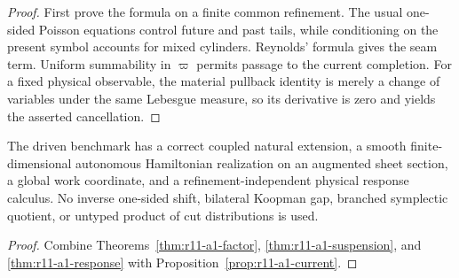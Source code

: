 \begin{proof}
First prove the formula on a finite common refinement.  The usual
one-sided Poisson equations control future and past tails, while conditioning
on the present symbol accounts for mixed cylinders.  Reynolds' formula gives
the seam term.  Uniform summability in $\varpi$ permits passage to the
current completion.  For a fixed physical observable, the material pullback
identity is merely a change of variables under the same Lebesgue measure, so
its derivative is zero and yields the asserted cancellation.
\end{proof}

\begin{theorem}
\label{thm:r11-a1-main}
The driven benchmark has a correct coupled natural extension, a smooth
finite-dimensional autonomous Hamiltonian realization on an augmented sheet
section, a global work coordinate, and a refinement-independent physical
response calculus.  No inverse one-sided shift, bilateral Koopman gap,
branched symplectic quotient, or untyped product of cut distributions is used.
\end{theorem}

\begin{proof}
Combine Theorems~\ref{thm:r11-a1-factor},
\ref{thm:r11-a1-suspension}, and \ref{thm:r11-a1-response} with
Proposition~\ref{prop:r11-a1-current}.
\end{proof}

